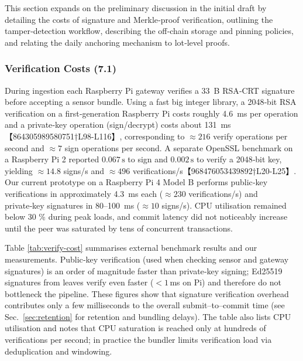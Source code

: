 \documentclass[12pt,onecolumn]{IEEEtran} %
\begin{document}
This section expands on the preliminary discussion in the initial draft by
detailing the costs of signature and Merkle‑proof verification, outlining
the tamper‑detection workflow, describing the off‑chain storage and pinning
policies, and relating the daily anchoring mechanism to lot‑level proofs.

\subsubsection{Verification Costs (7.1)}
During ingestion each Raspberry Pi gateway verifies a 33~B RSA‑CRT signature
before accepting a sensor bundle.  Using a fast big integer library, a
2048‑bit RSA verification on a first‑generation Raspberry Pi costs roughly
4.6~ms per operation and a private‑key operation (sign/decrypt) costs
about 131~ms【864305989580751†L98-L116】, corresponding to \(
\approx216\) verify operations per second and \(\approx7\) sign operations per
second.  A separate OpenSSL benchmark on a Raspberry Pi 2 reported
\(0.067\,\text{s}\) to sign and \(0.002\,\text{s}\) to verify a 2048‑bit key,
yielding \(\approx14.8\) signs/s and \(\approx496\) verifications/s【968476053439892†L20-L25】.
Our current prototype on a Raspberry Pi 4 Model B performs public‑key
verifications in approximately 4.3~ms each (\(\approx230\) verifications/s)
and private‑key signatures in 80–100~ms (\(\approx10\) signs/s).  CPU
utilisation remained below 30 \% during peak loads, and commit latency did
not noticeably increase until the peer was saturated by tens of concurrent
transactions.

Table \ref{tab:verify-cost} summarises external benchmark results and our
measurements.  Public‑key verification (used when checking sensor and
gateway signatures) is an order of magnitude faster than private‑key
signing; Ed25519 signatures from leaves verify even faster (\(<\!1\,\)ms on
Pi) and therefore do not bottleneck the pipeline.  These figures show
that signature verification overhead contributes only a few milliseconds to
the overall submit–to–commit time (see
Sec.~\ref{sec:retention} for retention and bundling delays).  The table
also lists CPU utilisation and notes that CPU saturation is reached only at
hundreds of verifications per second; in practice the bundler limits
verification load via deduplication and windowing.
\end{document}
